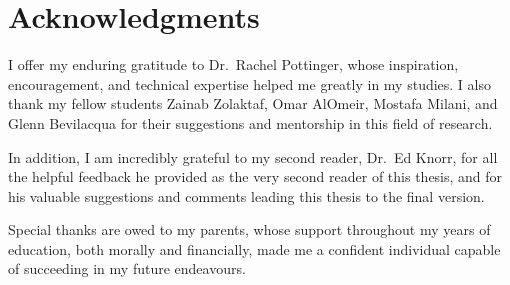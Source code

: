 
\chapter{Acknowledgments}

I offer my enduring gratitude to Dr.\ Rachel Pottinger, whose inspiration, encouragement, and technical expertise helped me greatly in my studies. I also thank my fellow students Zainab Zolaktaf, Omar AlOmeir, Mostafa Milani, and Glenn Bevilacqua for their suggestions and mentorship in this field of research.

In addition, I am incredibly grateful to my second reader, Dr.\ Ed Knorr, for all the helpful feedback he provided as the very second reader of this thesis, and for his valuable suggestions and comments leading this thesis to the final version.

Special thanks are owed to my parents, whose support throughout my years of education, both morally and financially, made me a confident individual capable of succeeding in my future endeavours.
\endinput